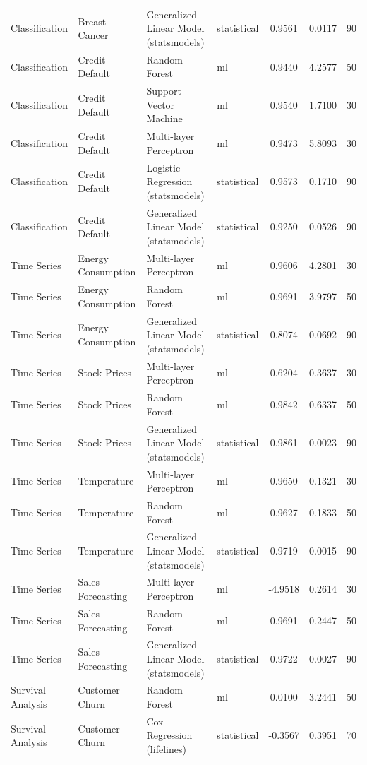 \documentclass[11pt,a4paper]{article}
\begin{document}
\begin{table}[h!]
\begin{tabular}{llllccc}
Classification & Breast Cancer & Generalized Linear Model (statsmodels) & statistical & 0.9561 & 0.0117 & 90 \\
Classification & Credit Default & Random Forest & ml & 0.9440 & 4.2577 & 50 \\
Classification & Credit Default & Support Vector Machine & ml & 0.9540 & 1.7100 & 30 \\
Classification & Credit Default & Multi-layer Perceptron & ml & 0.9473 & 5.8093 & 30 \\
Classification & Credit Default & Logistic Regression (statsmodels) & statistical & 0.9573 & 0.1710 & 90 \\
Classification & Credit Default & Generalized Linear Model (statsmodels) & statistical & 0.9250 & 0.0526 & 90 \\
Time Series & Energy Consumption & Multi-layer Perceptron & ml & 0.9606 & 4.2801 & 30 \\
Time Series & Energy Consumption & Random Forest & ml & 0.9691 & 3.9797 & 50 \\
Time Series & Energy Consumption & Generalized Linear Model (statsmodels) & statistical & 0.8074 & 0.0692 & 90 \\
Time Series & Stock Prices & Multi-layer Perceptron & ml & 0.6204 & 0.3637 & 30 \\
Time Series & Stock Prices & Random Forest & ml & 0.9842 & 0.6337 & 50 \\
Time Series & Stock Prices & Generalized Linear Model (statsmodels) & statistical & 0.9861 & 0.0023 & 90 \\
Time Series & Temperature & Multi-layer Perceptron & ml & 0.9650 & 0.1321 & 30 \\
Time Series & Temperature & Random Forest & ml & 0.9627 & 0.1833 & 50 \\
Time Series & Temperature & Generalized Linear Model (statsmodels) & statistical & 0.9719 & 0.0015 & 90 \\
Time Series & Sales Forecasting & Multi-layer Perceptron & ml & -4.9518 & 0.2614 & 30 \\
Time Series & Sales Forecasting & Random Forest & ml & 0.9691 & 0.2447 & 50 \\
Time Series & Sales Forecasting & Generalized Linear Model (statsmodels) & statistical & 0.9722 & 0.0027 & 90 \\
Survival Analysis & Customer Churn & Random Forest & ml & 0.0100 & 3.2441 & 50 \\
Survival Analysis & Customer Churn & Cox Regression (lifelines) & statistical & -0.3567 & 0.3951 & 70 \\

\end{tabular}
\end{table}
\end{document}
